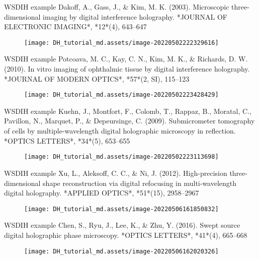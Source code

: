 \documentclass[t, aspectratio=169]{beamer}
\begin{document}
\begin{frame}{WSDIH example}
Dakoff, A., Gass, J., \& Kim, M. K. (2003). Microscopic three-dimensional imaging by digital interference holography. *JOURNAL OF ELECTRONIC IMAGING*, *12*(4), 643–647
\begin{figure}
	\texttt{[image: DH\_tutorial\_md.assets/image-20220502222329616]}
\end{figure}
\end{frame}


\begin{frame}{WSDIH example}
Potcoava, M. C., Kay, C. N., Kim, M. K., \& Richards, D. W. (2010). In vitro imaging of ophthalmic tissue by digital interference holography. *JOURNAL OF MODERN OPTICS*, *57*(2, SI), 115–123
\begin{figure}
	\texttt{[image: DH\_tutorial\_md.assets/image-20220502223428429]}
\end{figure}
\end{frame}


\begin{frame}{WSDIH example}
Kuehn, J., Montfort, F., Colomb, T., Rappaz, B., Moratal, C., Pavillon, N., Marquet, P., \& Depeursinge, C. (2009). Submicrometer tomography of cells by multiple-wavelength digital holographic microscopy in reflection. *OPTICS LETTERS*, *34*(5), 653–655
\begin{figure}
	\texttt{[image: DH\_tutorial\_md.assets/image-20220502223113698]}
\end{figure}
\end{frame}


\begin{frame}{WSDIH example}
Xu, L., Aleksoff, C. C., \& Ni, J. (2012). High-precision three-dimensional shape reconstruction via digital refocusing in multi-wavelength digital holography. *APPLIED OPTICS*, *51*(15), 2958–2967
\begin{figure}
	\texttt{[image: DH\_tutorial\_md.assets/image-20220506161850832]}
\end{figure}
\end{frame}


\begin{frame}{WSDIH example}
Chen, S., Ryu, J., Lee, K., \& Zhu, Y. (2016). Swept source digital holographic phase microscopy. *OPTICS LETTERS*, *41*(4), 665–668
\begin{figure}
	\texttt{[image: DH\_tutorial\_md.assets/image-20220506162020326]}
\end{figure}
\end{frame}
\end{document}
